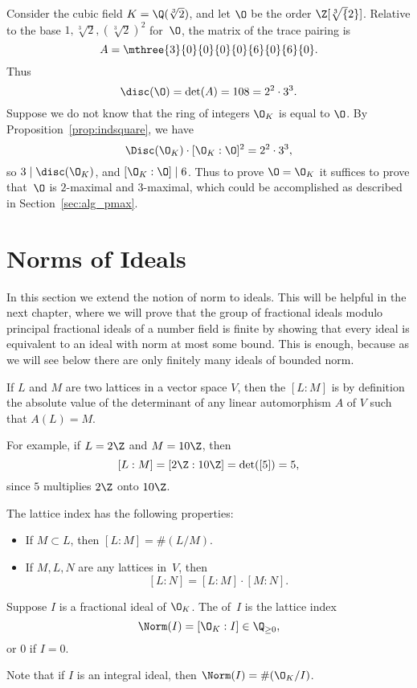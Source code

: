 \begin{example}
Consider the cubic field $K=\Q(\sqrt[3]{2})$, and
let $\O$ be the order $\Z[\sqrt[3]{2}]$.
Relative to the base $1,\sqrt[3]{2}, (\sqrt[3]{2})^2$ for~$\O$,
the matrix of the trace pairing is
$$
  A = \mthree{3}{0}{0}{0}{0}{6}{0}{6}{0}.
$$
Thus
$$
 \disc(\O) = \det(A)= 108 = 2^2\cdot 3^3.
$$
Suppose we do not know that the ring of integers
$\O_K$ is equal to $\O$.  By Proposition~\ref{prop:indsquare},
we  have
$$
\Disc(\O_K)\cdot [\O_K:\O]^2 = 2^2\cdot 3^3,
$$
so $3\mid \disc(\O_K)$, and $[\O_K:\O] \mid 6$.
Thus to prove $\O=\O_K$ it suffices to prove
that~$\O$ is $2$-maximal and $3$-maximal,
which could be accomplished as described in
Section~\ref{sec:alg_pmax}.
\end{example}

\section{Norms of Ideals}
In this section we extend the notion of norm to ideals.  This will be
helpful in the next chapter, where
we will prove that the group of fractional ideals modulo principal
fractional ideals of a number field is finite by showing that every
ideal is equivalent to an ideal with norm at most some bound.
This is enough, because as we will see below there are only
finitely many ideals of bounded norm.
\begin{definition}
If $L$ and $M$ are two lattices in a vector space $V$, then the
 $[L:M]$ is by definition the absolute value of the
determinant of any linear automorphism $A$ of $V$ such that $A(L)=M$.
\end{definition}
For example, if $L=2\Z$ and $M=10\Z$, then
$$
  [L:M] = [2\Z : 10\Z] = \det([5]) = 5,
$$
since $5$ multiplies $2\Z$ onto $10\Z$.

The lattice index has the
following properties:
\begin{itemize}
\item If $M\subset L$, then $[L:M]=\#(L/M)$.
\item If $M, L, N$ are any lattices in~$V$,
then $$[L:N] = [L:M]\cdot [M:N].$$
\end{itemize}


\begin{definition}
Suppose $I$ is a fractional ideal of $\O_K$.  The  of~$I$ is
the lattice index
$$
  \Norm(I) = [\O_K : I] \in \Q_{\geq 0},
$$
or $0$ if $I=0$.
\end{definition}
Note that if $I$ is an integral ideal, then $\Norm(I)=\#(\O_K/I)$.


